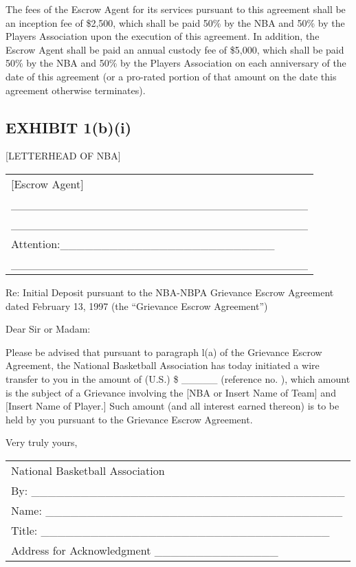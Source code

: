 \documentclass[
]{book}
\begin{document}
The fees of the Escrow Agent for its services pursuant to this agreement shall be an inception fee of \$2,500, which shall be paid 50\% by the NBA and 50\% by the Players Association upon the execution of this agreement. In addition, the Escrow Agent shall be paid an annual custody fee of \$5,000, which shall be paid 50\% by the NBA and 50\% by the Players Association on each anniversary of the date of this agreement (or a pro-rated portion of that amount on the date this agreement otherwise terminates).

\hypertarget{exhibit-1bi}{%
\subsection{EXHIBIT 1(b)(i)}\label{exhibit-1bi}}

{[}LETTERHEAD OF NBA{]}

\begin{longtable}[]{@{}l@{}}
\toprule()
\endhead
{[}Escrow Agent{]} \\
\_\_\_\_\_\_\_\_\_\_\_\_\_\_\_\_\_\_\_\_\_\_\_\_\_\_\_\_\_\_\_\_\_\_\_\_ \\
\_\_\_\_\_\_\_\_\_\_\_\_\_\_\_\_\_\_\_\_\_\_\_\_\_\_\_\_\_\_\_\_\_\_\_\_ \\
Attention:\_\_\_\_\_\_\_\_\_\_\_\_\_\_\_\_\_\_\_\_\_\_\_\_\_\_ \\
\_\_\_\_\_\_\_\_\_\_\_\_\_\_\_\_\_\_\_\_\_\_\_\_\_\_\_\_\_\_\_\_\_\_\_\_ \\
\bottomrule()
\end{longtable}

Re: Initial Deposit pursuant to the NBA-NBPA Grievance Escrow Agreement dated February 13, 1997 (the ``Grievance Escrow Agreement'')

Dear Sir or Madam:

Please be advised that pursuant to paragraph l(a) of the Grievance Escrow Agreement, the National Basketball Association has today initiated a wire transfer to you in the amount of (U.S.) \$ \_\_\_\_\_ (reference no. ), which amount is the subject of a Grievance involving the {[}NBA or Insert Name of Team{]} and {[}Insert Name of Player.{]} Such amount (and all interest earned thereon) is to be held by you pursuant to the Grievance Escrow Agreement.

Very truly yours,

\begin{longtable}[]{@{}l@{}}
\toprule()
\endhead
National Basketball Association \\
By: \_\_\_\_\_\_\_\_\_\_\_\_\_\_\_\_\_\_\_\_\_\_\_\_\_\_\_\_\_\_\_\_\_\_\_\_\_\_ \\
Name: \_\_\_\_\_\_\_\_\_\_\_\_\_\_\_\_\_\_\_\_\_\_\_\_\_\_\_\_\_\_\_\_\_\_\_\_ \\
Title: \_\_\_\_\_\_\_\_\_\_\_\_\_\_\_\_\_\_\_\_\_\_\_\_\_\_\_\_\_\_\_\_\_\_\_ \\
Address for Acknowledgment \_\_\_\_\_\_\_\_\_\_\_\_\_\_\_ \\
\bottomrule()
\end{longtable}
\end{document}
